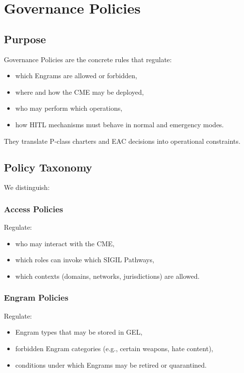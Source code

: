 \chapter{Governance Policies}
\label{chap:Governance_Policies}

\section{Purpose}

Governance Policies are the concrete rules that regulate:
\begin{itemize}
    \item which Engrams are allowed or forbidden,
    \item where and how the CME may be deployed,
    \item who may perform which operations,
    \item how HITL mechanisms must behave in normal and emergency modes.
\end{itemize}

They translate P-class charters and EAC decisions into operational constraints.

\section{Policy Taxonomy}

We distinguish:

\subsection{Access Policies}

Regulate:
\begin{itemize}
    \item who may interact with the CME,
    \item which roles can invoke which SIGIL Pathways,
    \item which contexts (domains, networks, jurisdictions) are allowed.
\end{itemize}

\subsection{Engram Policies}

Regulate:
\begin{itemize}
    \item Engram types that may be stored in GEL,
    \item forbidden Engram categories (e.g., certain weapons, hate content),
    \item conditions under which Engrams may be retired or quarantined.
\end{itemize}

